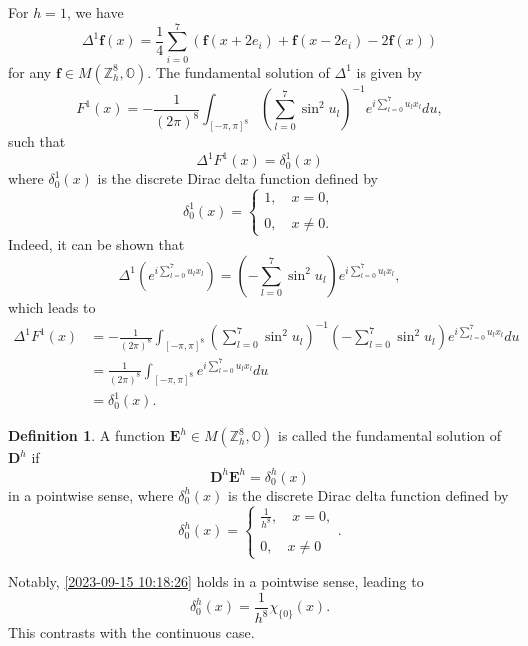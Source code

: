 \documentclass{amsart}
\theoremstyle{definition}
\newtheorem{definition}[theorem]{Definition}
\theoremstyle{remark}
\numberwithin{equation}{section}
\newcommand{\OO}{\mathbb O}
\newcommand{\Z}{\mathbb Z}
\newcommand{\f}{\bm{f}}
\newcommand{\E}{\bm{E}}
\begin{document}
    For $h=1$,  we have \[
\Delta^1 \f (x)=\frac{1}{4}\sum\limits_{i=0}^7 (\f(x+2e_i)+\f(x-2e_i)-2\f(x))
\] for any $\f\in M(\Z^8_h,\OO).$
    The fundamental solution of $\Delta^1$ is given by   \begin{equation}
        \label{2023-09-07 20:07:19}
        F^1(x)=- \frac{1}{(2\pi)^8}\int_{[-\pi,\pi]^8}  {\left(\sum\limits_{l=0}^7 \sin^2u_l\right)^{-1}} e^{i\sum\limits_{l=0}^7 u_lx_l} du,
    \end{equation}
such that
\begin{equation}
	\label{2023-09-07 09:51:28}
	\Delta^1   F^1(x)=\delta^1_0(x)
\end{equation}
where
$\delta_0^1(x)$ is the discrete Dirac delta function defined by   \[
\delta_0^1(x)=\begin{cases}
	1,\quad x=0,\\\\
	0,\quad x\neq 0.
\end{cases}
\]
 Indeed, it can be shown that  \[
\Delta^1\left( e^{i\sum\limits_{l=0}^7 u_lx_l}\right)=\left(-\sum\limits_{l=0}^7 \sin^2 u_l\right) e^{i\sum\limits_{l=0}^7 u_lx_l},
\] which leads to
    \begin{equation}
        \label{2023-09-07 10:05:31}
        \begin{aligned}
            \Delta^1 F^1(x)&= -\frac{1}{(2\pi)^8} \int_{[-\pi,\pi]^8}\left(\sum\limits_{l=0}^7 \sin^2u_l\right)^{-1}  \left(-\sum\limits_{l=0}^7\sin^2 u_l\right) e^{i\sum\limits_{l=0}^7 u_lx_l} du\\&= \frac{1}{(2\pi)^8} \int_{[-\pi,\pi]^8} e^{i\sum\limits_{l=0}^7 u_lx_l} du \\&= \delta_0^1(x).
        \end{aligned}
    \end{equation}




    \begin{definition}
        A function $\E^h\in M(\Z^8_h,\OO)$ is called the fundamental solution of $\bm D^h$ if \begin{equation}
            \label{2023-09-15 10:18:26}
            \bm D^h \E^h =\delta_0^h (x)
        \end{equation}
        in a pointwise  sense,
         where $\delta_0^h (x)$  is the discrete Dirac delta function defined by   \[
\delta_0^h (x)=\begin{cases}
            \frac{1}{h^8},\quad x=0,\\\\
            0,\quad x\neq 0
        \end{cases}.
\]
    \end{definition}
   Notably,  \eqref{2023-09-15 10:18:26} holds in a pointwise sense, leading to \begin{equation}
        \label{2023-09-15 10:07:31}
        \delta^h_0(x)=\frac{1}{h^8}\chi_{\{0\}}(x).
    \end{equation}
This contrasts with the continuous case.
\end{document}
